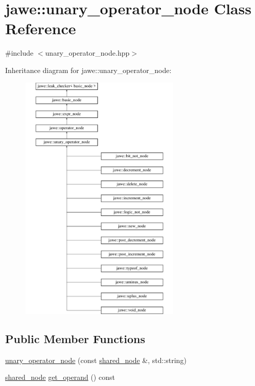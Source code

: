 \hypertarget{classjawe_1_1unary__operator__node}{}\section{jawe\+:\+:unary\+\_\+operator\+\_\+node Class Reference}
\label{classjawe_1_1unary__operator__node}


{\ttfamily \#include $<$unary\+\_\+operator\+\_\+node.\+hpp$>$}

Inheritance diagram for jawe\+:\+:unary\+\_\+operator\+\_\+node\+:\begin{figure}[H]
\begin{center}
\leavevmode
\includegraphics[height=12.000000cm]{classjawe_1_1unary__operator__node}
\end{center}
\end{figure}
\subsection*{Public Member Functions}
\begin{DoxyCompactItemize}
\item 
\hyperlink{classjawe_1_1unary__operator__node_a8910c06bbd0a82167972796bcdceba5d}{unary\+\_\+operator\+\_\+node} (const \hyperlink{namespacejawe_a3f307481d921b6cbb50cc8511fc2b544}{shared\+\_\+node} \&, std\+::string)
\item 
\hyperlink{namespacejawe_a3f307481d921b6cbb50cc8511fc2b544}{shared\+\_\+node} \hyperlink{classjawe_1_1unary__operator__node_ab714818721ad242f7e0495f9c12edeb9}{get\+\_\+operand} () const
\end{DoxyCompactItemize}
